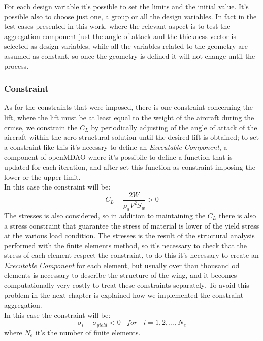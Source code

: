 For each design variable it's possible to set the limits and the initial value. It's possible also to choose just one, a group or all the design variables. In fact in the test cases presented in this work, where the relevant aspect is to test the aggregation component just the angle of attack and the thickness vector is selected as design variables, while all the variables related to the geometry are assumed as constant, so once the geometry is defined it will not change until the process.
\subsubsection{Constraint}
As for the constraints that were imposed, there is one constraint concerning the lift, where the lift must be at least equal to the weight of the aircraft during the cruise, we constrain the $C_L$ by periodically adjusting of the angle of attack of the aircraft within the aero-structural solution until the desired lift is obtained; to set a constraint like this it's necessry to define an \textit{Executable Component}, a component of openMDAO where it's possibile to define a function that is updated for each iteration, and after set this function as constraint imposing the lower or the upper limit. \\In this case the constraint will be:
\begin{equation*}
	C_L - \frac{2W}{\rho_aV^2S_w }> 0
\end{equation*}
The stresses is also considered, so in addition to maintaining the $C_L$ there is also a stress constraint that guarantee the stress of material is lower of the yield stress at the various load condition. The stresses is the result of the structural analysis performed with the finite elements method, so it's necessary to check that the stress of each element respect the constraint, to do this it's necessary to create an \textit{Executable Component} for each element, but usually over than thousand od elements is necessary to describe the structure of the wing, and it becomes computationally very costly to treat these constraints separately. To avoid this problem in the next chapter is explained how we implemented the constraint aggregation.\\ In this case the constraint will be:
\begin{equation*}
\sigma_i - \sigma_{yield} < 0 \ \ \ \ for \ \ \ \ i=1,2,...,N_e
\end{equation*}
where $N_e$ it's the number of finite elements.

